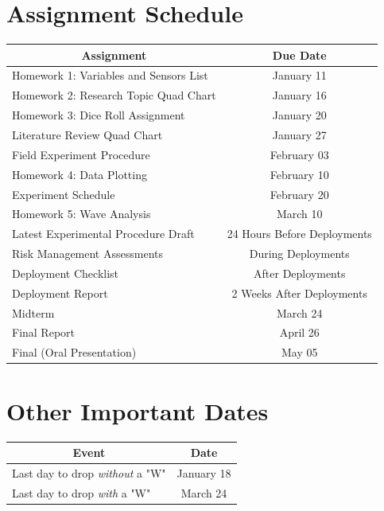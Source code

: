 \documentclass[
	letterpaper, %
	fontsize=10pt, %
	twoside=true, %
	numbers=noenddot, %
]{kaobook}
\begin{document}
\section*{Assignment Schedule} 
\begin{table}[h!] 
    \begin{tabular}{ l | c }
        \toprule
        \multicolumn{1}{c|}{\textbf{Assignment}} & \textbf{Due Date} \\
        \midrule
        Homework 1: Variables and Sensors List          & January 11 \\
        Homework 2: Research Topic Quad Chart           & January 16 \\
        Homework 3: Dice Roll Assignment                & January 20 \\
        Literature Review Quad Chart\footnotemark[2]    & January 27 \\
        Field Experiment Procedure                      & February 03 \\
        Homework 4: Data Plotting                       & February 10 \\
        Experiment Schedule                             & February 20 \\
        Homework 5: Wave Analysis                       & March 10 \\
        Latest Experimental Procedure Draft             & 24 Hours Before Deployments \\
        Risk Management Assessments                     & During Deployments \\
        Deployment Checklist                            & After Deployments \\
        Deployment Report                               & 2 Weeks After Deployments \\
        Midterm                                         & March 24 \\
        Final Report                                    & April 26 \\
        Final (Oral Presentation)                       & May 05 \\
        \bottomrule
    \end{tabular}
\end{table}

\section*{Other Important Dates} 
\begin{table}[h!]
    \begin{tabular}{ l | c }
        \toprule
        \multicolumn{1}{c|}{\textbf{Event}} & \textbf{Date} \\
        \midrule
        Last day to drop \emph{without} a "W"  & January 18 \\
        Last day to drop \emph{with} a "W"     & March 24   \\
        \bottomrule
    \end{tabular}
\end{table}
\end{document}
